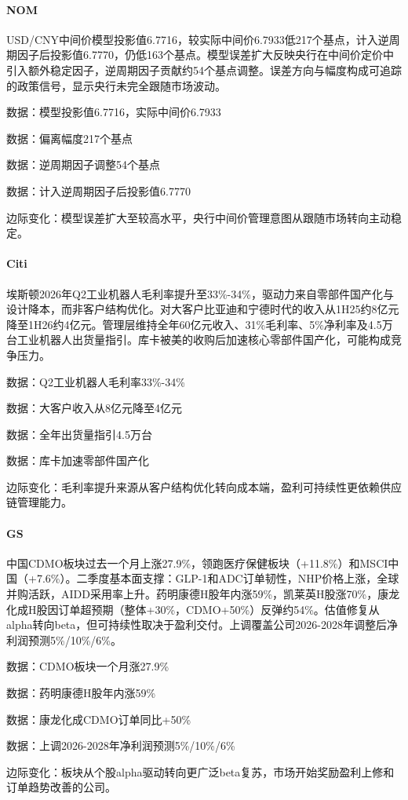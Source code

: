 \documentclass[11pt]{ctexart}
\begin{document}
\paragraph{NOM} USD/CNY中间价模型投影值6.7716，较实际中间价6.7933低217个基点，计入逆周期因子后投影值6.7770，仍低163个基点。模型误差扩大反映央行在中间价定价中引入额外稳定因子，逆周期因子贡献约54个基点调整。误差方向与幅度构成可追踪的政策信号，显示央行未完全跟随市场波动。
{\small\color{refgray}数据：模型投影值6.7716，实际中间价6.7933\par}
{\small\color{refgray}数据：偏离幅度217个基点\par}
{\small\color{refgray}数据：逆周期因子调整54个基点\par}
{\small\color{refgray}数据：计入逆周期因子后投影值6.7770\par}
{\small\color{refgray}边际变化：模型误差扩大至较高水平，央行中间价管理意图从跟随市场转向主动稳定。\par}
\paragraph{Citi} 埃斯顿2026年Q2工业机器人毛利率提升至33\%-34\%，驱动力来自零部件国产化与设计降本，而非客户结构优化。对大客户比亚迪和宁德时代的收入从1H25约8亿元降至1H26约4亿元。管理层维持全年60亿元收入、31\%毛利率、5\%净利率及4.5万台工业机器人出货量指引。库卡被美的收购后加速核心零部件国产化，可能构成竞争压力。
{\small\color{refgray}数据：Q2工业机器人毛利率33\%-34\%\par}
{\small\color{refgray}数据：大客户收入从8亿元降至4亿元\par}
{\small\color{refgray}数据：全年出货量指引4.5万台\par}
{\small\color{refgray}数据：库卡加速零部件国产化\par}
{\small\color{refgray}边际变化：毛利率提升来源从客户结构优化转向成本端，盈利可持续性更依赖供应链管理能力。\par}
\paragraph{GS} 中国CDMO板块过去一个月上涨27.9\%，领跑医疗保健板块（+11.8\%）和MSCI中国（+7.6\%）。二季度基本面支撑：GLP-1和ADC订单韧性，NHP价格上涨，全球并购活跃，AIDD采用率上升。药明康德H股年内涨59\%，凯莱英H股涨70\%，康龙化成H股因订单超预期（整体+30\%，CDMO+50\%）反弹约54\%。估值修复从alpha转向beta，但可持续性取决于盈利交付。上调覆盖公司2026-2028年调整后净利润预测5\%/10\%/6\%。
{\small\color{refgray}数据：CDMO板块一个月涨27.9\%\par}
{\small\color{refgray}数据：药明康德H股年内涨59\%\par}
{\small\color{refgray}数据：康龙化成CDMO订单同比+50\%\par}
{\small\color{refgray}数据：上调2026-2028年净利润预测5\%/10\%/6\%\par}
{\small\color{refgray}边际变化：板块从个股alpha驱动转向更广泛beta复苏，市场开始奖励盈利上修和订单趋势改善的公司。\par}
\end{document}
